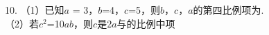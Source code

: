 10. （1）已知$a$ = 3，$b$=4，$c$=5，则$b$，$c$，$a$的第四比例项为\key{\hspace{2cm}}.\\

\hspace*{5mm}（2）若$c^2$=10$ab$，则$c$是2$a$与\key{\hspace{2cm}}的比例中项



